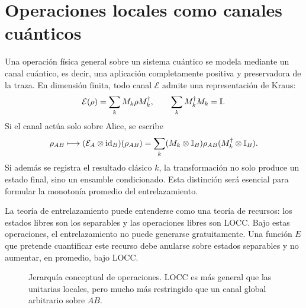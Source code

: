 \documentclass[../main.tex]{subfiles}
\begin{document}
\section{Operaciones locales como canales cuánticos}

Una operación física general sobre un sistema cuántico se modela mediante un canal cuántico, es decir, una aplicación completamente positiva y preservadora de la traza. En dimensión finita, todo canal \(\mathcal E\) admite una representación de Kraus:
\begin{equation}
    \mathcal E(\rho)=\sum_k M_k\rho M_k^\dagger,
    \qquad
    \sum_k M_k^\dagger M_k=\mathbb{I}.
    \label{eq:canal-kraus}
\end{equation}
Si el canal actúa solo sobre Alice, se escribe
\begin{equation*}
    \rho_{AB}\longmapsto
    (\mathcal E_A\otimes\operatorname{id}_B)(\rho_{AB})
    =\sum_k (M_k\otimes\mathbb{I}_B)\rho_{AB}(M_k^\dagger\otimes\mathbb{I}_B).
\end{equation*}
Si además se registra el resultado clásico \(k\), la transformación no solo produce un estado final, sino un ensamble condicionado. Esta distinción será esencial para formular la monotonía promedio del entrelazamiento.

\begin{observacion}
La teoría de entrelazamiento puede entenderse como una teoría de recursos: los estados libres son los separables y las operaciones libres son LOCC. Bajo estas operaciones, el entrelazamiento no puede generarse gratuitamente. Una función \(E\) que pretende cuantificar este recurso debe anularse sobre estados separables y no aumentar, en promedio, bajo LOCC.
\end{observacion}

\begin{figure}[H]
\centering
\shorthandoff{<>}
\shorthandon{<>}
\caption{Jerarquía conceptual de operaciones. LOCC es más general que las unitarias locales, pero mucho más restringido que un canal global arbitrario sobre \(AB\).}
\label{fig:jerarquia-operaciones-locc}
\end{figure}
\end{document}
